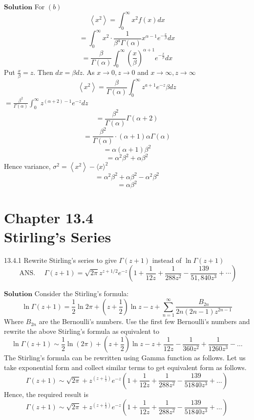 \documentclass{styles/kaobook}
\begin{document}
$\boxed{\textbf{Solution}}$ For $(b)$ 
$$
\left\langle x^{2}\right\rangle=\int_{0}^{\infty} x^{2} f(x) d x
$$
$$=\int_{0}^{\infty} x^{2} \cdot \frac{1}{\beta^{a} \Gamma(\alpha)} x^{\alpha-1} e^{-\frac{x}{\beta}} d x$$
$$=\frac{\beta}{\Gamma(\alpha)} \int_{0}^{\infty}\left(\frac{x}{\beta}\right)^{\alpha+1} e^{-\frac{x}{\beta}} d x$$
Put $\frac{x}{\beta}=z .$ Then $d x=\beta d z .$ As $x \rightarrow 0, z \rightarrow 0$ and $x \rightarrow \infty, z \rightarrow \infty$
$$
\left\langle x^{2}\right\rangle=\frac{\beta}{\Gamma(\alpha)} \int_{0}^{\infty} z^{a+1} e^{-z} \beta d z
$$
$=\frac{\beta^{2}}{\Gamma(\alpha)} \int_{0}^{\infty} z^{(\alpha+2)-1} e^{-z} d z$
$$=\frac{\beta^{2}}{\Gamma(\alpha)} \Gamma(\alpha+2)$$
$$=\frac{\beta^{2}}{\Gamma(\alpha)} \cdot(\alpha+1) \alpha \Gamma(\alpha)$$
$$=\alpha(\alpha+1) \beta^{2}$$
$$=\alpha^{2} \beta^{2}+\alpha \beta^{2}$$
Hence variance, $\sigma^{2}=\left\langle x^{2}\right\rangle-\langle x\rangle^{2}$
$$=\alpha^{2} \beta^{2}+\alpha \beta^{2}-\alpha^{2} \beta^{2}$$
$$=\alpha \beta^{2}$$


\newpage


\chapter*{Chapter 13.4 \\ Stirling's Series}

\begin{greenbox}{13.4.1}
Rewrite Stirling's series to give $\Gamma(z+1)$ instead of $\ln \Gamma(z+1)$
$$
\text { ANS. } \quad \Gamma(z+1)=\sqrt{2 \pi} z^{z+1 / 2} e^{-z}\left(1+\frac{1}{12 z}+\frac{1}{288 z^{2}}-\frac{139}{51,840 z^{3}}+\cdots\right)
$$
\end{greenbox}
$\boxed{\textbf{Solution}}$ Consider the Stirling's formula: 
$$\ln \Gamma(z+1)=\frac{1}{2} \ln 2 \pi+\left(z+\frac{1}{2}\right) \ln z-z+\sum_{n=1}^{\infty} \frac{B_{2 n}}{2 n(2 n-1) z^{2 n-1}}$$
Where $B_{2 n}$ are the Bernoulli's numbers. Use the first few Bernoulli's numbers and rewrite the above Stirling's formula as equivalent to
$$\ln \Gamma(z+1) \sim \frac{1}{2} \ln (2 \pi)+\left(z+\frac{1}{2}\right) \ln z-z+\frac{1}{12 z}-\frac{1}{360 z^{2}}+\frac{1}{1260 z^{3}}-\ldots$$
The Stirling's formula can be rewritten using Gamma function as follows.
Let us take exponential form and collect similar terms to get equivalent form as follows.
$$
\Gamma(z+1) \sim \sqrt{2 \pi}+z^{\left(z+\frac{1}{2}\right)} e^{-z}\left(1+\frac{1}{12 z}+\frac{1}{288 z^{2}}-\frac{139}{51840 z^{3}}+\ldots\right)
$$
Hence, the required result is $$\Gamma(z+1) \sim \sqrt{2 \pi}+z^{\left(z+\frac{1}{2}\right)} e^{-z}\left(1+\frac{1}{12 z}+\frac{1}{288 z^{2}}-\frac{139}{51840 z^{3}}+\ldots\right)$$
\end{document}
